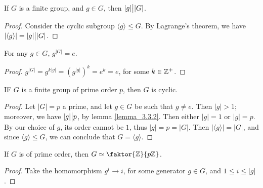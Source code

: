 \begin{lemma}\label{lemma_3.3.2}
  If $G$ is a finite group, and  $g \in G$, then $|g| \big{|} |G|$.
\end{lemma}
\begin{proof}
  Consider the cyclic subgroup $\langle g \rangle \leq G$. By
  Lagrange's theorem, we have $|\langle g \rangle|=|g| \big{|} |G|$.
\end{proof}
\begin{corollary}
  For any $g \in G$, $g^{|G|}=e$.
\end{corollary}
\begin{proof}
  $g^{|G|}=g^{k|g|}=(g^{|g|})^k=e^k=e$, for some $k \in \mathbb{Z}^+$.
\end{proof}

\begin{lemma}\label{lemma_3.3.3}
  IF $G$ is a finite group of prime order $p$, then $G$ is cyclic.
\end{lemma}
\begin{proof}
  Let $|G|=p$ a prime, and let $g \in G$ be such that $g \neq e$. Then
  $|g|>1$; moreover, we have $|g| \big{|} p$, by lemma \ref{lemma_3.3.2}. Then
  either $|g|=1$ or $|g|=p$. By our choice of $g$, its order cannot be
  $1$, thus  $|g|=p=|G|$. Then $|\langle g \rangle|=|G|$, and since
  $\langle g \rangle \leq G$, we can conclude that $G=\langle g \rangle$.
\end{proof}
\begin{corollary}
  If $G$ is of prime order, then  $G \simeq \faktor{\Z}{p\Z}$.
\end{corollary}
\begin{proof}
  Take the homomorphism $g^i \rightarrow i$, for some generator $g \in G$, and
  $1 \leq i \leq |g|$.
\end{proof}

